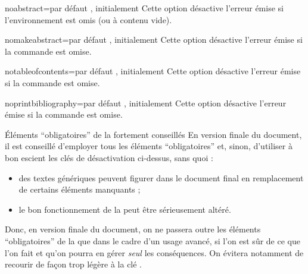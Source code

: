 \begin{description}
\begin{docKey}{noabstract}{=\textbar{}}{par
      défaut , initialement }
    Cette option désactive l'erreur émise si l'environnement 
    est omis (ou à contenu vide).
  \end{docKey}
  \begin{docKey}{nomakeabstract}{=\textbar{}}{par
      défaut , initialement }
    Cette option désactive l'erreur émise si la commande 
    est omise.
  \end{docKey}
  \begin{docKey}{notableofcontents}{=\textbar{}}{par
      défaut , initialement }
    Cette option désactive l'erreur émise si la commande
     est omise.
  \end{docKey}
  \begin{docKey}{noprintbibliography}{=\textbar{}}{par
      défaut , initialement }
    Cette option désactive l'erreur émise si la commande
     est omise.
  \end{docKey}
\end{description}

\begin{dbwarning}{Éléments \enquote{obligatoires} de la \yatcl{}
    fortement conseillés}{}
  En version finale du document, il est conseillé d'employer tous les éléments
  \enquote{obligatoires} et, sinon, d'utiliser à bon escient les clés de
  désactivation ci-dessus, sans quoi :
  \begin{itemize}
  \item des textes génériques peuvent figurer dans le document final en
    remplacement de certains éléments manquants ;
  \item le bon fonctionnement de la \yatcl{} peut être sérieusement altéré.
  \end{itemize}
  Donc, en version finale du document, on ne passera outre les éléments
  \enquote{obligatoires} de la \yatcl{} que dans le cadre d'un usage avancé, si
  l'on est sûr de ce que l'on fait et qu'on pourra en gérer \emph{seul} les
  conséquences.  On évitera notamment de recourir de façon trop légère à la clé
  .
\end{dbwarning}

